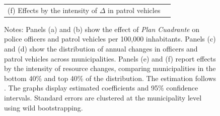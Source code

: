 \begin{figure}[H]
\begin{tabular}{cc}
\begin{minipage}[t]{0.48\textwidth}
            \small (f) Effects by the intensity of $\Delta$ in patrol vehicles
        \end{minipage}
    \end{tabular}
    \vspace{4pt}
    \begin{minipage}{0.99\textwidth}
    \footnotesize Notes: Panels (a) and (b) show the effect of \emph{Plan Cuadrante} on police officers and patrol vehicles per 100,000 inhabitants. Panels (c) and (d) show the distribution of annual changes in officers and patrol vehicles across municipalities. Panels (e) and (f) report effects by the intensity of resource changes, comparing municipalities in the bottom 40\% and top 40\% of the distribution. The estimation follows \citet{Callaway}. The graphs display estimated coefficients and 95\% confidence intervals. Standard errors are clustered at the municipality level using wild bootstrapping.
    \end{minipage}
\end{figure}